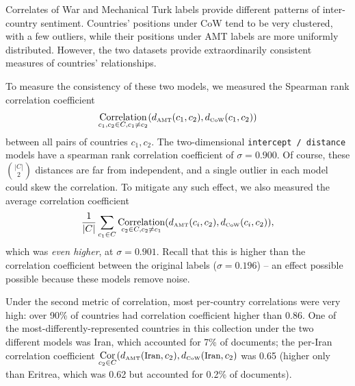 Correlates of War and Mechanical Turk labels provide different
patterns of inter-country sentiment.  Countries' positions under CoW
tend to be very clustered, with a few outliers, while their positions under
AMT labels are more uniformly distributed.  However, the two datasets
provide extraordinarily consistent measures of countries' relationships.

To measure the consistency of these two models, we measured the
Spearman rank correlation coefficient 
\begin{align*}
\underset{c_1, c_2 \in C, c_1   \neq c_2}
{\operatorname{\mbox{Correlation}}}(d_{\mbox{\tiny AMT}}(c_1, c_2), d_{\mbox{\tiny CoW}}(c_1, c_2))
\end{align*}
between all pairs of countries $c_1, c_2$. The two-dimensional
\verb!intercept / distance! models have a spearman rank correlation
coefficient of $\sigma=0.900$.  Of course, these $|C| \choose{2}$
distances are far from independent, and a single outlier in each model
could skew the correlation.  To mitigate any such effect, we also measured
the average correlation coefficient
\begin{align*}
  \frac{1}{|C|} \sum_{c_1 \in C}
  \underset{c_2 \in C, c_2 \neq c_1}
  {\operatorname{\mbox{Correlation}}}(d_{\mbox{\tiny AMT}}(c_i, c_2), d_{\mbox{\tiny
        CoW}}(c_i, c_2) ),
\end{align*}
which was \emph{even higher}, at $\sigma=0.901$. Recall that this is
higher than the correlation coefficient between the original labels
($\sigma=0.196$) -- an effect possible possible because these models
remove noise.

Under the second metric of correlation, most per-country correlations
were very high: over 90\% of countries had correlation coefficient
higher than 0.86.  One of the most-differently-represented countries
in this collection under the two different models was Iran, which
accounted for 7\% of documents; the per-Iran correlation coefficient
$\underset{c_2 \in C}{\operatorname{\mbox{Cor}}}(d_{\mbox{\tiny AMT}}(\mbox{\small Iran}, c_2),
d_{\mbox{\tiny CoW}}(\mbox{\small Iran}, c_2)$ was 0.65 (higher only
than Eritrea, which was 0.62 but accounted for 0.2\% of documents).

